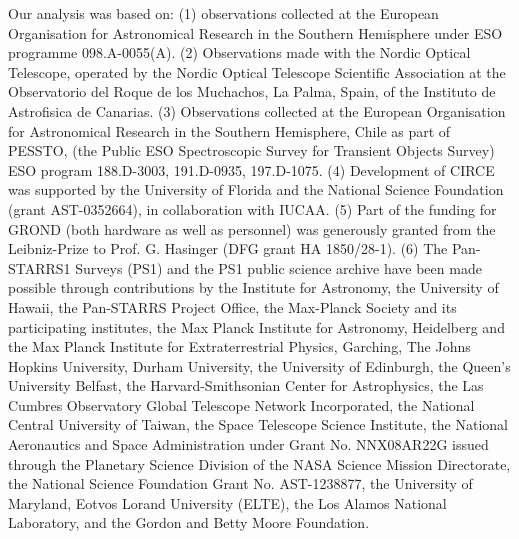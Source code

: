 \documentclass[traditabstract,longauth]{aa}
\begin{document}
Our analysis was based on: (1) observations collected at the European Organisation for Astronomical Research in the Southern Hemisphere under ESO programme 098.A-0055(A). (2) Observations made with the Nordic Optical Telescope, operated by the Nordic Optical Telescope Scientific Association at the Observatorio del Roque de los Muchachos, La Palma, Spain, of the Instituto de Astrofisica de Canarias. (3) Observations collected at the European Organisation for Astronomical Research in the Southern Hemisphere, Chile as part of PESSTO, (the Public ESO Spectroscopic Survey for Transient Objects Survey) ESO program 188.D-3003, 191.D-0935, 197.D-1075. (4) Development of CIRCE was supported by the University of Florida and the National Science Foundation (grant AST-0352664), in collaboration with IUCAA. (5) Part of the funding for GROND (both hardware as well as personnel) was generously granted from the Leibniz-Prize to Prof. G. Hasinger (DFG grant HA 1850/28-1).  (6) The Pan-STARRS1 Surveys (PS1) and the PS1 public science archive have been made possible through contributions by the Institute for Astronomy, the University of Hawaii, the Pan-STARRS Project Office, the Max-Planck Society and its participating institutes, the Max Planck Institute for Astronomy, Heidelberg and the Max Planck Institute for Extraterrestrial Physics, Garching, The Johns Hopkins University, Durham University, the University of Edinburgh, the Queen's University Belfast, the Harvard-Smithsonian Center for Astrophysics, the Las Cumbres Observatory Global Telescope Network Incorporated, the National Central University of Taiwan, the Space Telescope Science Institute, the National Aeronautics and Space Administration under Grant No. NNX08AR22G issued through the Planetary Science Division of the NASA Science Mission Directorate, the National Science Foundation Grant No. AST-1238877, the University of Maryland, Eotvos Lorand University (ELTE), the Los Alamos National Laboratory, and the Gordon and Betty Moore Foundation.







\end{document}
